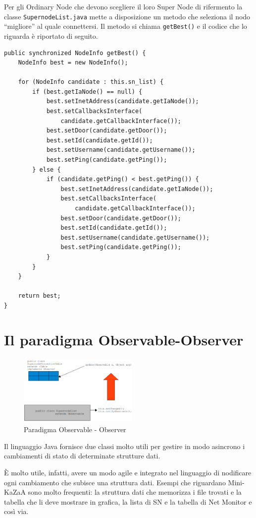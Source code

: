 Per gli Ordinary Node che devono scegliere il loro Super Node di rifermento la classe \verb|SupernodeList.java| mette a disposizione un metodo che seleziona il nodo ``migliore'' al quale connettersi. Il metodo si chiama \verb|getBest()| e il codice che lo riguarda è riportato di seguito.
\begin{lstlisting}
public synchronized NodeInfo getBest() {
	NodeInfo best = new NodeInfo();

	for (NodeInfo candidate : this.sn_list) {
		if (best.getIaNode() == null) {
			best.setInetAddress(candidate.getIaNode());
			best.setCallbacksInterface(
				candidate.getCallbackInterface());
			best.setDoor(candidate.getDoor());
			best.setId(candidate.getId());
			best.setUsername(candidate.getUsername());
			best.setPing(candidate.getPing());
		} else {
			if (candidate.getPing() < best.getPing()) {
				best.setInetAddress(candidate.getIaNode());
				best.setCallbacksInterface(
					candidate.getCallbackInterface());
				best.setDoor(candidate.getDoor());
				best.setId(candidate.getId());
				best.setUsername(candidate.getUsername());
				best.setPing(candidate.getPing());
			}
		}
	}
	
	return best;
}
\end{lstlisting}


\section{Il paradigma Observable-Observer}\label{sec:obs-obs}
\begin{figure}[t]
 \centering
 \includegraphics[width=218.72px,height=129.12px,bb=14 14 635 381]{images/observable.eps}
 \caption{Paradigma Observable - Observer}
 \label{fig:observable}
\end{figure}
Il linguaggio Java fornisce due classi molto utili per gestire in modo asincrono i cambiamenti di stato di determinate strutture dati.

\`{E} molto utile, infatti, avere un modo agile e integrato nel linguaggio di nodificare ogni cambiamento che subisce una struttura dati. Esempi che riguardano Mini-KaZaA sono molto frequenti: la struttura dati che memorizza i file trovati e la tabella che li deve mostrare in grafica, la lista di SN e la tabella di Net Monitor e così via.

